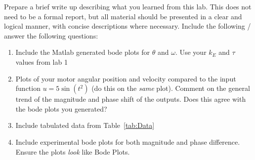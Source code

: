 Prepare a brief write up describing what you learned from this lab. This does not
need to be a formal report, but all material should be presented in a clear and logical manner,
with concise descriptions where necessary. Include the following / answer the following questions:
\begin{enumerate}
    \item Include the Matlab generated bode plots for \(\theta \) and \(\omega \). Use your \(k_E\) and \(\tau \) values
          from lab 1
    \item Plots of your motor angular position and velocity compared to the input function \(u =  5\sin(t^2)\) (do this on the \emph{same} plot).
          Comment on the general trend of the magnitude and phase shift of the outputs. Does this agree
          with the bode plots you generated?
    \item Include tabulated data from Table~\ref{tab:Data}
    \item Include experimental bode plots for both magnitude and phase difference. Ensure the plots \emph{look} like Bode Plots.
\end{enumerate}

